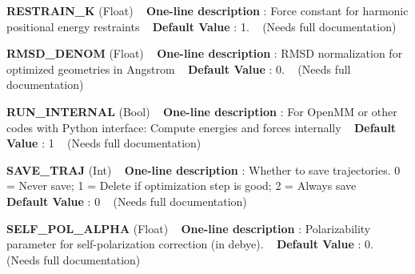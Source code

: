 \begin{DoxyItemize}
\item {\bfseries  R\+E\+S\+T\+R\+A\+I\+N\+\_\+K } (Float) ~\newline
{\bfseries  One-\/line description }\+: Force constant for harmonic positional energy restraints ~\newline
{\bfseries  Default Value }\+: 1. ~\newline
(Needs full documentation)\end{DoxyItemize}
\begin{DoxyItemize}
\item {\bfseries  R\+M\+S\+D\+\_\+\+D\+E\+N\+OM } (Float) ~\newline
{\bfseries  One-\/line description }\+: R\+M\+SD normalization for optimized geometries in Angstrom ~\newline
{\bfseries  Default Value }\+: 0. ~\newline
(Needs full documentation)\end{DoxyItemize}
\begin{DoxyItemize}
\item {\bfseries  R\+U\+N\+\_\+\+I\+N\+T\+E\+R\+N\+AL } (Bool) ~\newline
{\bfseries  One-\/line description }\+: For Open\+MM or other codes with Python interface\+: Compute energies and forces internally ~\newline
{\bfseries  Default Value }\+: 1 ~\newline
(Needs full documentation)\end{DoxyItemize}
\begin{DoxyItemize}
\item {\bfseries  S\+A\+V\+E\+\_\+\+T\+R\+AJ } (Int) ~\newline
{\bfseries  One-\/line description }\+: Whether to save trajectories. 0 = Never save; 1 = Delete if optimization step is good; 2 = Always save ~\newline
{\bfseries  Default Value }\+: 0 ~\newline
(Needs full documentation)\end{DoxyItemize}
\begin{DoxyItemize}
\item {\bfseries  S\+E\+L\+F\+\_\+\+P\+O\+L\+\_\+\+A\+L\+P\+HA } (Float) ~\newline
{\bfseries  One-\/line description }\+: Polarizability parameter for self-\/polarization correction (in debye). ~\newline
{\bfseries  Default Value }\+: 0. ~\newline
(Needs full documentation)\end{DoxyItemize}
